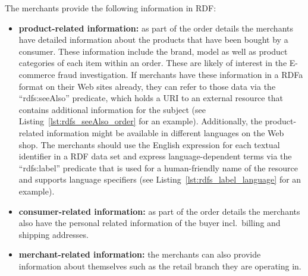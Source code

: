 The merchants provide the following information in \gls{RDF}:\@

\begin{itemize}
  \item \textbf{product-related information:} as part of the order details the merchants have detailed information about the products that have been bought by a consumer. These information include the brand, model as well as product categories of each item within an order. These are likely of interest in the \gls{E-commerce} fraud investigation. If merchants have these information in a \gls{RDFa} format on their Web sites already, they can refer to those data via the ``rdfs:seeAlso'' predicate, which holds a \gls{URI} to an external resource that contains additional information for the subject (see Listing~\ref{lst:rdfs_seeAlso_order} for an example). Additionally, the product-related information might be available in different languages on the Web shop. The merchants should use the English expression for each textual identifier in a \gls{RDF} data set and express language-dependent terms via the ``rdfs:label'' predicate that is used for a human-friendly name of the resource and supports language specifiers (see Listing~\ref{lst:rdfs_label_language} for an example).
  \item \textbf{consumer-related information:} as part of the order details the merchants also have the personal related information of the buyer incl.\ billing and shipping addresses.
  \item \textbf{merchant-related information:} the merchants can also provide information about themselves such as the retail branch they are operating in.
\end{itemize}




